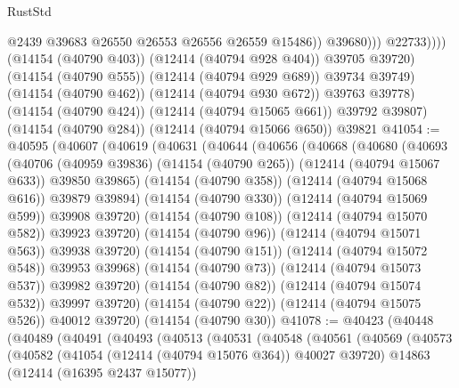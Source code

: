 \begin{lexlean}{RustStd}
\begin{coremodule}
{\begin{coremodule}
{{{{{{{{{{{{{{{{{{{{{{{{{{{{{{{{{{{{{{{{{{{{{{{{{{                              @2439
                              @39683
                              @26550
                              @26553
                              @26556
                              @26559
                              @15486))
                          @39680)))
                    @22733))))
            (@14154 (@40790 @403))
            (@12414 (@40794 @928 @404))
            @39705
            @39720)
          (@14154 (@40790 @555))
          (@12414 (@40794 @929 @689))
          @39734
          @39749)
        (@14154 (@40790 @462))
        (@12414 (@40794 @930 @672))
        @39763
        @39778)
      (@14154 (@40790 @424))
      (@12414 (@40794 @15065 @661))
      @39792
      @39807)
    (@14154 (@40790 @284))
    (@12414 (@40794 @15066 @650))
    @39821
@41054 := @40595
    (@40607
      (@40619
        (@40631
          (@40644
            (@40656
              (@40668
                (@40680
                  (@40693
                    (@40706
                      (@40959 @39836)
                      (@14154 (@40790 @265))
                      (@12414 (@40794 @15067 @633))
                      @39850
                      @39865)
                    (@14154 (@40790 @358))
                    (@12414 (@40794 @15068 @616))
                    @39879
                    @39894)
                  (@14154 (@40790 @330))
                  (@12414 (@40794 @15069 @599))
                  @39908
                  @39720)
                (@14154 (@40790 @108))
                (@12414 (@40794 @15070 @582))
                @39923
                @39720)
              (@14154 (@40790 @96))
              (@12414 (@40794 @15071 @563))
              @39938
              @39720)
            (@14154 (@40790 @151))
            (@12414 (@40794 @15072 @548))
            @39953
            @39968)
          (@14154 (@40790 @73))
          (@12414 (@40794 @15073 @537))
          @39982
          @39720)
        (@14154 (@40790 @82))
        (@12414 (@40794 @15074 @532))
        @39997
        @39720)
      (@14154 (@40790 @22))
      (@12414 (@40794 @15075 @526))
      @40012
      @39720)
    (@14154 (@40790 @30))
@41078 := @40423
    (@40448
      (@40489
        (@40491
          (@40493
            (@40513
              (@40531
                (@40548
                  (@40561
                    (@40569
                      (@40573
                        (@40582
                          (@41054 (@12414 (@40794 @15076 @364)) @40027 @39720)
                          @14863
                          (@12414 (@16395 @2437 @15077))
}}}}}}}}}}}}}}}}}}}}}}}}}}}}}}}}}}}}}}}}}}}}}}}}}}
\end{coremodule}}
\end{coremodule}
\end{lexlean}

